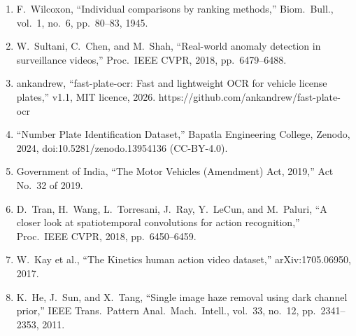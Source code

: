 \documentclass[10pt,a4paper,twocolumn]{article}
\begin{document}
{\begin{enumerate}[leftmargin=1.6em,label={\arabic*.},itemsep=0pt]
\item F.\ Wilcoxon, ``Individual comparisons by ranking methods,'' Biom.\ Bull., vol.\ 1, no.\ 6, pp.\ 80--83, 1945.
\item W.\ Sultani, C.\ Chen, and M.\ Shah, ``Real-world anomaly detection in surveillance videos,'' Proc.\ IEEE CVPR, 2018, pp.\ 6479--6488.
\item ankandrew, ``fast-plate-ocr: Fast and lightweight OCR for vehicle license plates,'' v1.1, MIT licence, 2026. https://github.com/ankandrew/fast-plate-ocr
\item ``Number Plate Identification Dataset,'' Bapatla Engineering College, Zenodo, 2024, doi:10.5281/zenodo.13954136 (CC-BY-4.0).
\item Government of India, ``The Motor Vehicles (Amendment) Act, 2019,'' Act No.\ 32 of 2019.
\item D.\ Tran, H.\ Wang, L.\ Torresani, J.\ Ray, Y.\ LeCun, and M.\ Paluri, ``A closer look at spatiotemporal convolutions for action recognition,'' Proc.\ IEEE CVPR, 2018, pp.\ 6450--6459.
\item W.\ Kay et al., ``The Kinetics human action video dataset,'' arXiv:1705.06950, 2017.
\item K.\ He, J.\ Sun, and X.\ Tang, ``Single image haze removal using dark channel prior,'' IEEE Trans.\ Pattern Anal.\ Mach.\ Intell., vol.\ 33, no.\ 12, pp.\ 2341--2353, 2011.
\end{enumerate}}
\end{document}
